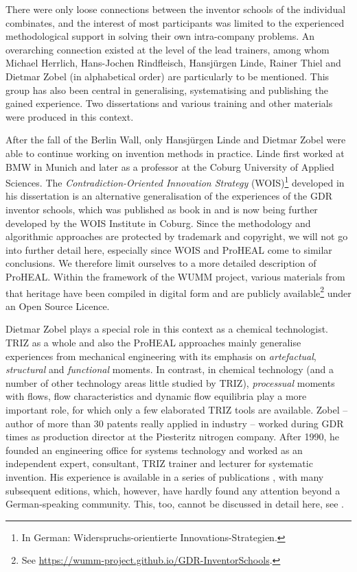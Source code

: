 \documentclass[11pt,a4paper]{article}
\begin{document}
There were only loose connections between the inventor schools of the
individual combinates, and the interest of most participants was limited to
the experienced methodological support in solving their own intra-company
problems. An overarching connection existed at the level of the lead trainers,
among whom Michael Herrlich, Hans-Jochen Rindfleisch, Hansjürgen Linde, Rainer
Thiel and Dietmar Zobel (in alphabetical order) are particularly to be
mentioned.  This group has also been central in generalising, systematising
and publishing the gained experience. Two dissertations \cite{Linde1988,
  Herrlich1988} and various training and other materials \cite{HMT1985,
  Herrlich1982, Herrlich1986, Hill1987, RT1986, Speicher1980, Thiel1977,
  Thiel1980, Thiel1986} were produced in this context.

After the fall of the Berlin Wall, only Hansjürgen Linde and Dietmar Zobel
were able to continue working on invention methods in practice. Linde first
worked at BMW in Munich and later as a professor at the Coburg University of
Applied Sciences. The \emph{Contradiction-Oriented Innovation Strategy}
(WOIS)\footnote{In German: Widerspruchs-orientierte Innovations-Strategien.}
developed in his dissertation \cite{Linde1988} is an alternative
generalisation of the experiences of the GDR inventor schools, which was
published as book in \cite{LindeHill1993} and is now being further developed
by the WOIS Institute in Coburg. Since the methodology and algorithmic
approaches are protected by trademark and copyright, we will not go into
further detail here, especially since WOIS and ProHEAL come to similar
conclusions. We therefore limit ourselves to a more detailed description of
ProHEAL. Within the framework of the WUMM project, various materials from that
heritage have been compiled in digital form and are publicly
available\footnote{See
  \url{https://wumm-project.github.io/GDR-InventorSchools}.} under an Open
Source Licence.

Dietmar Zobel plays a special role in this context as a chemical technologist.
TRIZ as a whole and also the ProHEAL approaches mainly generalise experiences
from mechanical engineering with its emphasis on \emph{artefactual},
\emph{structural} and \emph{functional} moments. In contrast, in chemical
technology (and a number of other technology areas little studied by TRIZ),
\emph{processual} moments with flows, flow characteristics and dynamic flow
equilibria play a more important role, for which only a few elaborated TRIZ
tools are available. Zobel -- author of more than 30 patents really applied in
industry -- worked during GDR times as production director at the Piesteritz
nitrogen company. After 1990, he founded an engineering office for systems
technology and worked as an independent expert, consultant, TRIZ trainer and
lecturer for systematic invention. His experience is available in a series of
publications \cite{Zobel1985, Zobel1991, Zobel2001, Zobel2006, Zobel2007,
  Zobel2009}, with many subsequent editions, which, however, have hardly found
any attention beyond a German-speaking community. This, too, cannot be
discussed in detail here, see \cite{Graebe2019a, Graebe2019b, Thiel2016}.
\end{document}

